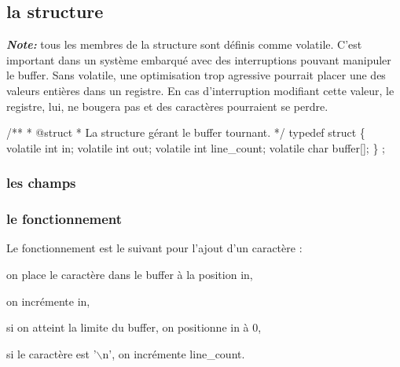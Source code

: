 \documentclass[10pt]{article}%
\begin{document}
\subsection{la structure}

\textbf{\textit{Note: }} tous les membres de la structure sont définis comme {\Tt{}volatile\nwendquote}. C'est important dans un système embarqué avec des interruptions pouvant manipuler le buffer. Sans {\Tt{}volatile\nwendquote}, une optimisation trop agressive pourrait placer une des valeurs entières dans un registre. En cas d'interruption modifiant cette valeur, le registre, lui, ne bougera pas et des caractères pourraient se perdre.

\nwenddocs{}\endmoddef\nwstartdeflinemarkup{}\nwenddeflinemarkup
/**
 * @struct 
 * La structure gérant le buffer tournant.
 */
typedef struct \{
    volatile int in;
    volatile int out;
    volatile int line_count;
    volatile char buffer[];
\} ;
\eatline
{}\nwendcode{}\nwdocspar
\nwenddocs{}\nwdocspar
\subsubsection{les champs}

\subsubsection{le fonctionnement}
Le fonctionnement est le suivant pour l'ajout d'un caractère :

\begin{packed_enum}
  \item on place le caractère dans le buffer à la position {\Tt{}in\nwendquote},
  \item on incrémente {\Tt{}in\nwendquote},
  \item si on atteint la limite du buffer, on positionne {\Tt{}in\nwendquote} à 0,
  \item si le caractère est '$\backslash$n', on incrémente {\Tt{}line{\_}count\nwendquote}.
\end{packed_enum}
\end{document}
